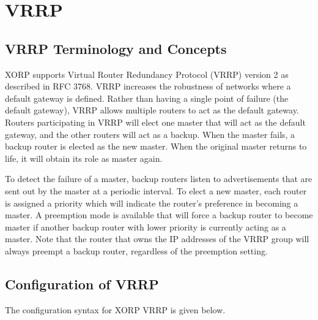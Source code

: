%
%

\chapter{\label{vrrp}VRRP}

\section{VRRP Terminology and Concepts}
XORP supports Virtual Router Redundancy Protocol (VRRP) version 2 as described
in RFC 3768.  VRRP increases the robustness of networks where a default gateway
is defined.  Rather than having a single point of failure (the default gateway),
VRRP allows multiple routers to act as the default gateway.  Routers
participating in VRRP will elect one master that will act as the default
gateway, and the other routers will act as a backup.  When the master fails, a
backup router is elected as the new master.  When the original master returns to
life, it will obtain its role as master again.  

To detect the failure of a master, backup routers listen to advertisements that
are sent out by the master at a periodic interval.  To elect a new master, each
router is assigned a priority which will indicate the router's preference in
becoming a master.  A preemption mode is available that will force a backup
router to become master if another backup router with lower priority is
currently acting as a master.  Note that the router that owns the IP addresses
of the VRRP group will always preempt a backup router, regardless of the
preemption setting.

\section{Configuration of VRRP}
The configuration syntax for XORP VRRP is given below.


